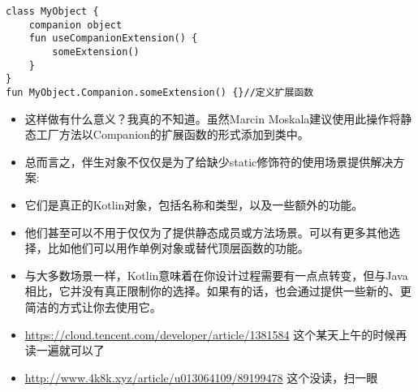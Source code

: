 \documentclass[9pt, b5paper]{article}
\begin{document}
\begin{verbatim}
class MyObject {
    companion object
    fun useCompanionExtension() {
        someExtension()
    }
}
fun MyObject.Companion.someExtension() {}//定义扩展函数
\end{verbatim}
\begin{itemize}
\item 这样做有什么意义？我真的不知道。虽然Marcin Moskala建议使用此操作将静态工厂方法以Companion的扩展函数的形式添加到类中。
\item 总而言之，伴生对象不仅仅是为了给缺少static修饰符的使用场景提供解决方案:
\item 它们是真正的Kotlin对象，包括名称和类型，以及一些额外的功能。
\item 他们甚至可以不用于仅仅为了提供静态成员或方法场景。可以有更多其他选择，比如他们可以用作单例对象或替代顶层函数的功能。
\item 与大多数场景一样，Kotlin意味着在你设计过程需要有一点点转变，但与Java相比，它并没有真正限制你的选择。如果有的话，也会通过提供一些新的、更简洁的方式让你去使用它。
\item \url{https://cloud.tencent.com/developer/article/1381584} 这个某天上午的时候再读一遍就可以了
\item \url{http://www.4k8k.xyz/article/u013064109/89199478} 这个没读，扫一眼
\end{itemize}
\end{document}
